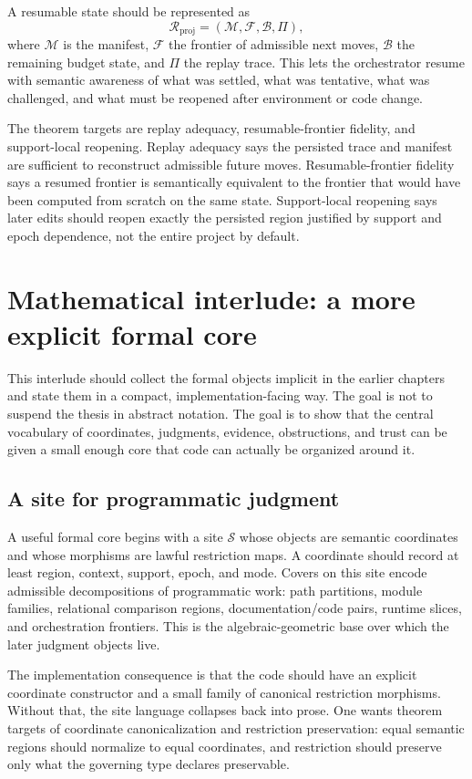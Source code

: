 \documentclass[11pt]{report}
\begin{document}
A resumable state should be represented as
\[
\mathcal{R}_{\mathrm{proj}} = (\mathcal{M}, \mathcal{F}, \mathcal{B}, \Pi),
\]
where $\mathcal{M}$ is the manifest, $\mathcal{F}$ the frontier of admissible next moves, $\mathcal{B}$ the remaining budget state, and $\Pi$ the replay trace. This lets the orchestrator resume with semantic awareness of what was settled, what was tentative, what was challenged, and what must be reopened after environment or code change.

The theorem targets are replay adequacy, resumable-frontier fidelity, and support-local reopening. Replay adequacy says the persisted trace and manifest are sufficient to reconstruct admissible future moves. Resumable-frontier fidelity says a resumed frontier is semantically equivalent to the frontier that would have been computed from scratch on the same state. Support-local reopening says later edits should reopen exactly the persisted region justified by support and epoch dependence, not the entire project by default.
\chapter{Mathematical interlude: a more explicit formal core}
This interlude should collect the formal objects implicit in the earlier chapters and state them in a compact, implementation-facing way. The goal is not to suspend the thesis in abstract notation. The goal is to show that the central vocabulary of coordinates, judgments, evidence, obstructions, and trust can be given a small enough core that code can actually be organized around it.
\section{A site for programmatic judgment}
A useful formal core begins with a site $\mathcal{S}$ whose objects are semantic coordinates and whose morphisms are lawful restriction maps. A coordinate should record at least region, context, support, epoch, and mode. Covers on this site encode admissible decompositions of programmatic work: path partitions, module families, relational comparison regions, documentation/code pairs, runtime slices, and orchestration frontiers. This is the algebraic-geometric base over which the later judgment objects live.

The implementation consequence is that the code should have an explicit coordinate constructor and a small family of canonical restriction morphisms. Without that, the site language collapses back into prose. One wants theorem targets of coordinate canonicalization and restriction preservation: equal semantic regions should normalize to equal coordinates, and restriction should preserve only what the governing type declares preservable.
\end{document}
